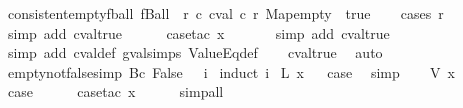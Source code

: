 \begin{isabellebody}
\ consistent{\isacharunderscore}empty{\isacharunderscore}fball{\isacharcolon}\ {\isachardoublequoteopen}fBall\ {\isacharparenleft}{\isasymlbrakk}{\isasymrbrakk}\ r{\isacharparenright}\ {\isacharparenleft}{\isasymlambda}c{\isachardot}\ cval\ c\ r\ Map{\isachardot}empty\ {\isacharequal}\ true{\isacharparenright}{\isachardoublequoteclose}\isanewline
%
\isadelimproof
\ \ %
\endisadelimproof
%
\isatagproof
{}\isamarkupfalse%
\ {\isacharparenleft}cases\ r{\isacharparenright}\isanewline
\ \ \ \ \ \isamarkupfalse%
\ {\isacharparenleft}simp\ add{\isacharcolon}\ cval{\isacharunderscore}true{\isacharparenright}\isanewline
\ \ \ \ \isamarkupfalse%
\ {\isacharparenleft}case{\isacharunderscore}tac\ x{}{\isacharparenright}\isanewline
\ \ \ \ \ \isamarkupfalse%
\ {\isacharparenleft}simp\ add{\isacharcolon}\ cval{\isacharunderscore}true{\isacharparenright}\isanewline
\ \ \ \ \isamarkupfalse%
\ {\isacharparenleft}simp\ add{\isacharcolon}\ cval{\isacharunderscore}def\ gval{\isachardot}simps\ ValueEq{\isacharunderscore}def{\isacharparenright}\isanewline
\ \ \isamarkupfalse%
\ cval{\isacharunderscore}true\ \isamarkupfalse%
\ auto%
\endisatagproof
{\isafoldproof}%
%
\isadelimproof
\isanewline
%
\endisadelimproof
\isanewline
{}\isamarkupfalse%
\ empty{\isacharunderscore}not{\isacharunderscore}false{\isacharbrackleft}simp{\isacharbrackright}{\isacharcolon}\ {\isachardoublequoteopen}{\isacharbraceleft}{\isacharbar}Bc\ False{\isacharbar}{\isacharbraceright}\ {\isasymnoteq}\ {\isasymlbrakk}{\isasymrbrakk}\ i{\isachardoublequoteclose}\isanewline
%
\isadelimproof
%
\endisadelimproof
%
\isatagproof
{}\isamarkupfalse%
\ {\isacharparenleft}induct\ i{\isacharparenright}\isanewline
{}\isamarkupfalse%
\ {\isacharparenleft}L\ x{\isacharparenright}\isanewline
{}\isamarkupfalse%
\ \isamarkupfalse%
\ {\isacharquery}case\ \isamarkupfalse%
\ simp\isanewline
{}\isamarkupfalse%
\isanewline
\ \ \isamarkupfalse%
\ {\isacharparenleft}V\ x{\isacharparenright}\isanewline
\ \ \isamarkupfalse%
\ \isamarkupfalse%
\ {\isacharquery}case\isanewline
\ \ \ \ \isamarkupfalse%
\ {\isacharparenleft}case{\isacharunderscore}tac\ x{\isacharparenright}\isanewline
\ \ \ \ \isamarkupfalse%
\ simp{\isacharunderscore}all\isanewline
{}\isamarkupfalse%
\isanewline
\ \ \isamarkupfalse%

\end{isabellebody}

